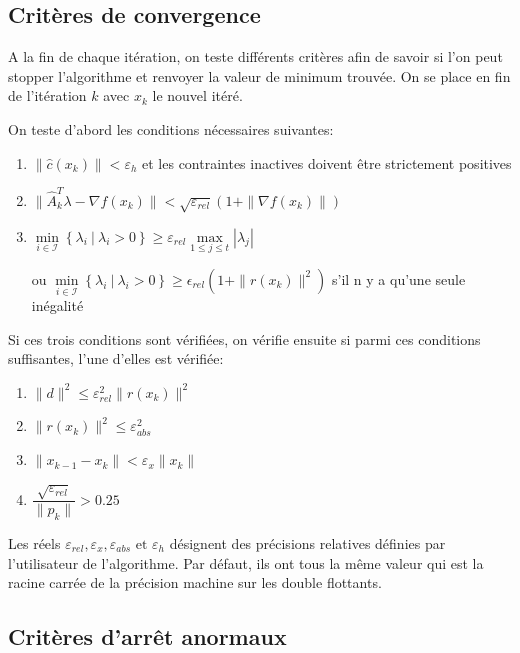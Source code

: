 \documentclass[a4paper,11pt]{article}
\numberwithin{equation}{section}
\begin{document}
\subsection{Critères de convergence}

A la fin de chaque itération, on teste différents critères afin de savoir si l'on peut stopper l'algorithme et renvoyer la valeur de minimum trouvée. On se place en fin de l'itération $k$ avec $x_{k}$ le nouvel itéré.

On teste d'abord les conditions nécessaires suivantes:
\begin{enumerate}
\item
$\|\hat{c}(x_{k})\| < \varepsilon_{h}$  et les contraintes inactives doivent être strictement positives
\item
$\|\hat{A}_{k}^T\lambda - \nabla f(x_{k})\| < \sqrt{\varepsilon_{rel}}\left(1+\|\nabla f(x_{k})\|\right)$
\item
$\underset{i \in \mathcal{I}}{\min}\left\{ \lambda_i\ |\ \lambda_i > 0 \right\} \geq \varepsilon_{rel} \underset{1\leq j\leq t}{\max} |\lambda_j|$ 

$\text{ou } \underset{i \in \mathcal{I}}{\min}\left\{ \lambda_i\ |\ \lambda_i > 0 \right\} \geq \epsilon_{rel} \left(1+\|r(x_{k})\|^2\right) $ s'il n y a qu'une seule inégalité
\end{enumerate}

Si ces trois conditions sont vérifiées, on vérifie ensuite si parmi ces conditions suffisantes, l'une d'elles est vérifiée: 

\begin{enumerate}
\item
$\|d\|^2 \leq \varepsilon_{rel}^2 \|r(x_{k})\|^2$
\item
$\|r(x_{k})\|^2 \leq \varepsilon_{abs}^2$
\item
$\|x_{k-1} - x_k\| < \varepsilon_{x}\|x_k\|$
\item
$\dfrac{\sqrt{\varepsilon_{rel}}}{\|p_k\|} > 0.25$
\end{enumerate}

Les réels $\varepsilon_{rel},\varepsilon_{x}, \varepsilon_{abs} \text{ et } \varepsilon_{h}$ désignent des précisions relatives définies par l'utilisateur de l'algorithme. Par défaut, ils ont tous la même valeur qui est la racine carrée de la précision machine sur les double flottants.

\subsection{Critères d'arrêt anormaux}
\end{document}
